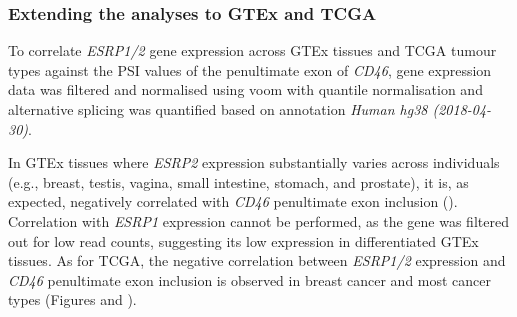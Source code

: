 \subsubsection{Extending the analyses to GTEx and TCGA}

To correlate \emph{ESRP1/2} gene expression across GTEx tissues and TCGA tumour types against the PSI values of the penultimate exon of \emph{CD46}, gene expression data was filtered and normalised using voom with quantile normalisation \cite{ritchie:2015tm} and alternative splicing was quantified based on annotation \emph{Human hg38 (2018-04-30)}.

In GTEx tissues where \emph{ESRP2} expression substantially varies across individuals (e.g., breast, testis, vagina, small intestine, stomach, and prostate), it is, as expected, negatively correlated with \emph{CD46} penultimate exon inclusion (). Correlation with \emph{ESRP1} expression cannot be performed, as the gene was filtered out for low read counts, suggesting its low expression in differentiated GTEx tissues. As for TCGA, the negative correlation between \emph{ESRP1/2} expression and \emph{CD46} penultimate exon inclusion is observed in breast cancer and most cancer types (Figures  and ).

